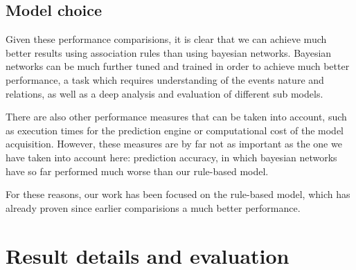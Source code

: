 \documentclass[a4paper,12pt]{article}
\begin{document}
\subsection{Model choice}
Given these performance comparisions, it is clear that we can achieve much better results using association rules than using bayesian networks. Bayesian networks can be much further tuned and trained in order to achieve much better performance, a task which requires understanding of the events nature and relations, as well as a deep analysis and evaluation of different sub models.

There are also other performance measures that can be taken into account, such as execution times for the prediction engine or computational cost of the model acquisition. However, these measures are by far not as important as the one we have taken into account here: prediction accuracy, in which bayesian networks have so far performed much worse than our rule-based model. 

For these reasons, our work has been focused on the rule-based model, which has already proven since earlier comparisions a much better performance.

\section{Result details and evaluation}


\clearpage

 

\end{document}

